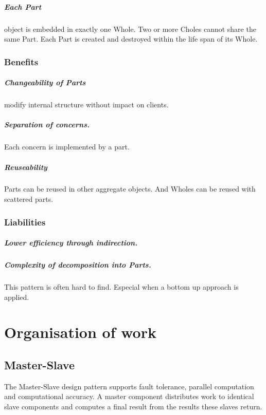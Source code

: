 \documentclass[a4paper,11pt,twocolumn]{report}
\begin{document}
    \paragraph{Each Part} object is embedded in exactly one Whole. Two or more
    Choles cannot share the same Part. Each Part is created and destroyed
    within the life span of its Whole.
    \subsection{Benefits}
    \paragraph{Changeability of Parts} modify internal structure without impact
    on clients.
    \paragraph{Separation of concerns.} Each concern is implemented by a part.
    \paragraph{Reuseability} Parts can be reused in other aggregate objects.
    And Wholes can be reused with scattered parts.
    \subsection{Liabilities}
    \paragraph{Lower efficiency through indirection.}
    \paragraph{Complexity of decomposition into Parts.} This pattern is often
    hard to find. Especial when a bottom up approach is applied.
    
    
    \chapter{Organisation of work}

    \section{Master-Slave}
    The Master-Slave design pattern supports fault tolerance, parallel
    computation and computational accuracy. A master component distributes work
    to identical slave components and computes a final result from the results
    these slaves return.
\end{document}
